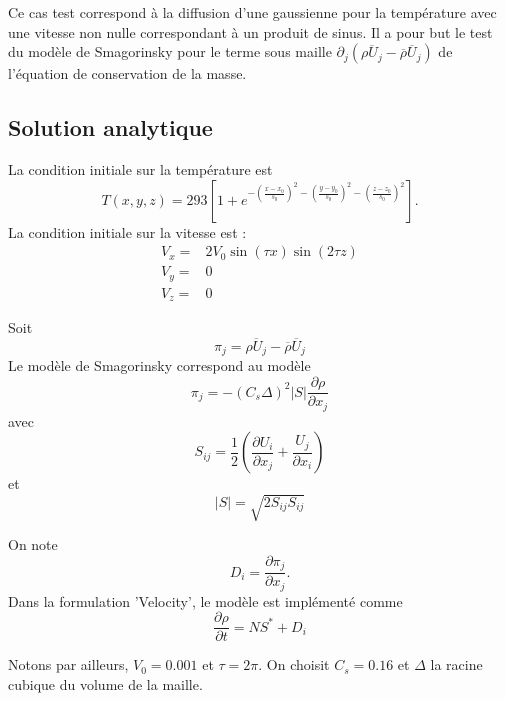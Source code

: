 Ce cas test correspond \`a la diffusion d'une gaussienne pour la temp\'erature avec une vitesse non nulle correspondant \`a un produit de sinus. Il a pour but le test du mod\`ele de Smagorinsky pour le terme sous maille $\partial_j\left(\overline{\rho U_j} - \overline{\rho}\overline{U}_j\right)$ de l'\'equation de conservation de la masse.

\subsection{Solution analytique}

La condition initiale sur la temp\'erature est
\begin{equation}
T\left(x,y,z\right) = 293 \left[1 + e^{-\left(\frac{x-x_0}{s_0}\right)^2-\left(\frac{y-y_0}{s_0}\right)^2-\left(\frac{z-z_0}{s_0}\right)^2}\right].
\end{equation}
La condition initiale sur la vitesse est :
\begin{align*}
V_x ={}& 2 V_0 \sin(\tau x) \sin(2 \tau z) \\
V_y ={}& 0 \\
V_z ={}& 0
\end{align*}

Soit
\begin{equation}
\pi_{j} = \overline{\rho U_j} - \overline{\rho}\overline{U}_j
\end{equation}
Le mod\`ele de Smagorinsky correspond au mod\`ele
\begin{equation}
\pi_{j} = - \left(C_s \Delta\right)^2 \left|S\right| \frac{\partial \rho}{\partial x_j}
\end{equation}
avec
\begin{equation}
S_{ij} = \frac{1}{2}\left(\frac{\partial U_i}{\partial x_j} + \frac{U_j}{\partial x_i}\right)
\end{equation}
et
\begin{equation}
\left|S\right| = \sqrt{2 S_{ij} S_{ij}}
\end{equation}

On note
\begin{equation}
D_i = \frac{\partial \pi_{j}}{\partial x_j}.
\end{equation}
Dans la formulation 'Velocity', le mod\`ele est impl\'ement\'e comme
\begin{equation}
\frac{\partial \rho}{\partial t} = NS^* + D_i
\end{equation}

Notons par ailleurs, $V_0 = 0.001$ et $\tau=2\pi$. On choisit $C_s=0.16$ et $\Delta$ la racine cubique du volume de la maille.

